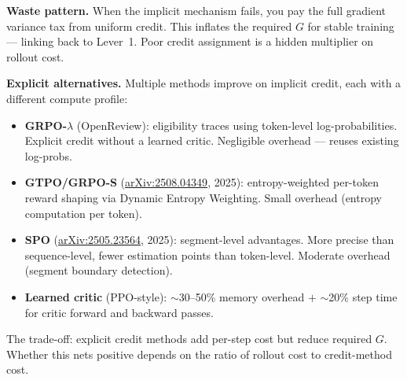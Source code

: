 \textbf{Waste pattern.} When the implicit mechanism fails, you pay the full gradient variance tax from uniform credit. This inflates the required $G$ for stable training --- linking back to Lever~1. Poor credit assignment is a hidden multiplier on rollout cost.

\textbf{Explicit alternatives.} Multiple methods improve on implicit credit, each with a different compute profile:
\begin{itemize}
  \item \textbf{GRPO-$\lambda$} (OpenReview): eligibility traces using token-level log-probabilities. Explicit credit without a learned critic. Negligible overhead --- reuses existing log-probs.
  \item \textbf{GTPO/GRPO-S} (\href{https://arxiv.org/abs/2508.04349}{arXiv:2508.04349}, 2025): entropy-weighted per-token reward shaping via Dynamic Entropy Weighting. Small overhead (entropy computation per token).
  \item \textbf{SPO} (\href{https://arxiv.org/abs/2505.23564}{arXiv:2505.23564}, 2025): segment-level advantages. More precise than sequence-level, fewer estimation points than token-level. Moderate overhead (segment boundary detection).
  \item \textbf{Learned critic} (PPO-style): $\sim$30--50\% memory overhead $+$ $\sim$20\% step time for critic forward and backward passes.
\end{itemize}

The trade-off: explicit credit methods add per-step cost but reduce required $G$. Whether this nets positive depends on the ratio of rollout cost to credit-method cost.

